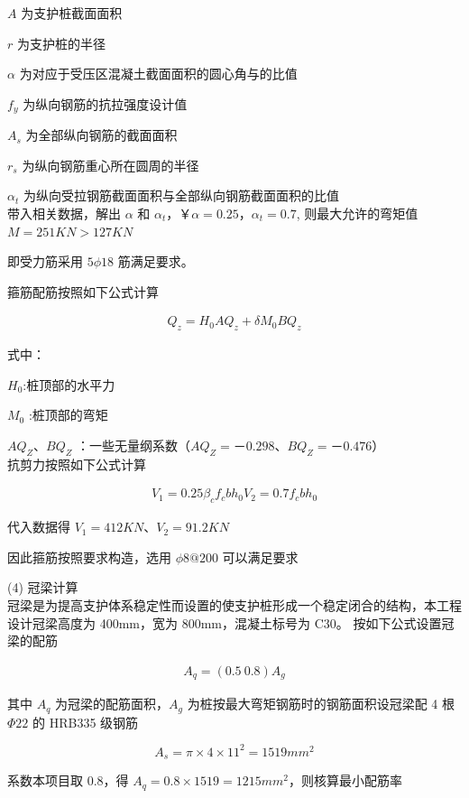 $A$ 为支护桩截面面积

$r$ 为支护桩的半径

$\alpha $ 为对应于受压区混凝土截面面积的圆心角与的比值

$f_y$ 为纵向钢筋的抗拉强度设计值

$A_s$ 为全部纵向钢筋的截面面积

$r_s$ 为纵向钢筋重心所在圆周的半径

$\alpha_t$ 为纵向受拉钢筋截面面积与全部纵向钢筋截面面积的比值\\

带入相关数据，解出 $\alpha \text{ 和 } \alpha_t$，￥$\alpha=0.25$，$\alpha_t=0.7$,
则最大允许的弯矩值 $M=251 KN > 127 KN$

即受力筋采用 $5\phi 18$ 筋满足要求。

箍筋配筋按照如下公式计算

\begin{align}
    \label{fx:6.8}
    Q_z=H_0AQ_z+\delta M_0BQ_z
\end{align}

式中：

$H_0$:桩顶部的水平力

$M_0$ :桩顶部的弯矩

$AQ_Z$、$BQ_Z$ ：一些无量纲系数（$AQ_Z=－0.298$、$BQ_Z=－0.476$）\\

抗剪力按照如下公式计算

\begin{align}
    \label{fx:6.8}
    V_1=0.25 \beta_cf_cbh_0
    V_2=0.7 f_cbh_0
\end{align}

代入数据得 $V_1=412KN$、$V_2=91.2KN$

因此箍筋按照要求构造，选用 $\phi8@200$ 可以满足要求

(4) 冠梁计算\\

冠梁是为提高支护体系稳定性而设置的使支护桩形成一个稳定闭合的结构，本工程设计冠梁高度为 400mm，宽为 800mm，混凝土标号为 C30。
按如下公式设置冠梁的配筋

\begin{align}
    \label{fx:6.9}
    A_q=(0.5~0.8)A_g
\end{align}

其中 $A_q$ 为冠梁的配筋面积，$A_g$ 为桩按最大弯矩钢筋时的钢筋面积设冠梁配 4 根 $\Phi22$ 的 HRB335 级钢筋

\[A_s=\pi \times 4\times 11^2=1519 mm^2\]

系数本项目取 0.8，得 $A_q=0.8\times 1519=1215 mm^2$，则核算最小配筋率

